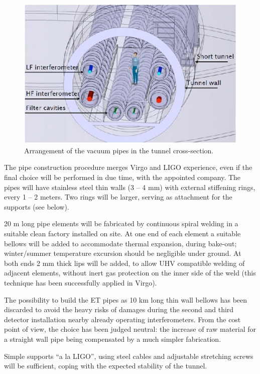 \begin{figure}
\begin{center}
\includegraphics{Sec_SiteInfra/Figures/VAC4.jpg}
\caption{Arrangement of the vacuum pipes in the tunnel cross-section.}
\label{fig:vac4}
\end{center}
\end{figure}

The pipe construction procedure merges Virgo and LIGO experience, even if the final choice will be performed in due time, with the appointed company. The pipes will have stainless steel thin walls (3 -- 4 mm) with external stiffening rings, every 1 -- 2 meters. Two rings will be larger, serving as attachment for the supports (see below).

20 m long pipe elements will be fabricated by continuous spiral welding in a suitable clean factory installed on site. At one end of each element a suitable bellows will be added to accommodate thermal expansion, during bake-out; winter/summer temperature excursion should be negligible under ground. At both ends 2 mm thick lips will be added, to allow UHV compatible welding of adjacent elements, without inert gas protection on the inner side of the weld (this technique has been successfully applied in Virgo).

The possibility to build the ET pipes as 10 km long thin wall bellows has been discarded to avoid the heavy risks of damages during the second and third detector installation nearby already operating interferometers. From the cost point of view, the choice has been judged neutral: the increase of raw material for a straight wall pipe being compensated by a much simpler fabrication.

Simple supports ``a la LIGO'', using steel cables and adjustable stretching screws will be sufficient, coping with the expected stability of the tunnel.

